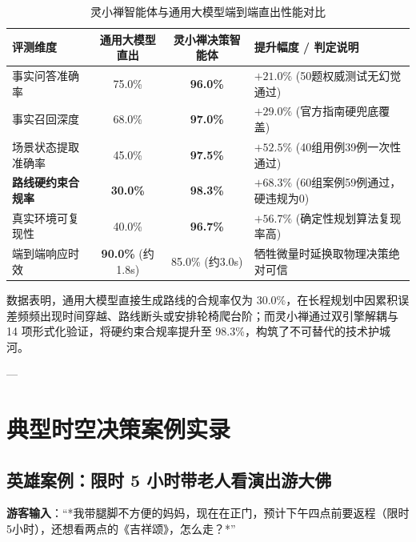 \documentclass[11pt,a4paper]{ctexart}
\begin{document}
\begin{table}[htbp]
\centering
\small
\caption{灵小禅智能体与通用大模型端到端直出性能对比}
\label{tab:benchmark}
\begin{tabularx}{\textwidth}{p{3.5cm}ccX}
\toprule
\textbf{评测维度} & \textbf{通用大模型直出} & \textbf{灵小禅决策智能体} & \textbf{提升幅度 / 判定说明} \\
\midrule
事实问答准确率 & 75.0\% & \textbf{96.0\%} & $+21.0\%$ (50题权威测试无幻觉通过) \\
事实召回深度 & 68.0\% & \textbf{97.0\%} & $+29.0\%$ (官方指南硬兜底覆盖) \\
场景状态提取准确率 & 45.0\% & \textbf{97.5\%} & $+52.5\%$ (40组用例39例一次性通过) \\
\textbf{路线硬约束合规率} & \textbf{30.0\%} & \textbf{98.3\%} & \textbf{$+68.3\%$} (60组案例59例通过，硬违规为0) \\
真实环境可复现性 & 40.0\% & \textbf{96.7\%} & $+56.7\%$ (确定性规划算法复现率高) \\
端到端响应时效 & \textbf{90.0\%} (约1.8s) & 85.0\% (约3.0s) & 牺牲微量时延换取物理决策绝对可信 \\
\bottomrule
\end{tabularx}
\end{table}

数据表明，通用大模型直接生成路线的合规率仅为 30.0\%，在长程规划中因累积误差频频出现时间穿越、路线断头或安排轮椅爬台阶；而灵小禅通过双引擎解耦与 14 项形式化验证，将硬约束合规率提升至 98.3\%，构筑了不可替代的技术护城河。

---

\section{典型时空决策案例实录}

\subsection{英雄案例：限时 5 小时带老人看演出游大佛}
\textbf{游客输入}：“*我带腿脚不方便的妈妈，现在在正门，预计下午四点前要返程（限时5小时），还想看两点的《吉祥颂》，怎么走？*”
\end{document}
